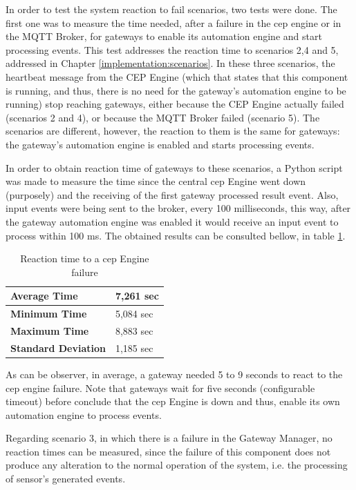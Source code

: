 In order to test the system reaction to fail scenarios, two tests were done. The first one was to measure the time needed, after a failure in the \ac{cep} engine or in the MQTT Broker, for gateways to enable its automation engine and start processing events. This test addresses the reaction time to scenarios 2,4 and 5, addressed in Chapter \ref{implementation:scenarios}. In these three scenarios, the heartbeat message from the CEP Engine (which that states that this component is running, and thus, there is no need for the gateway's automation engine to be running) stop reaching gateways, either because the CEP Engine actually failed (scenarios 2 and 4), or because the MQTT Broker failed (scenario 5). The scenarios are different, however, the reaction to them is the same for gateways: the gateway's automation engine is enabled and starts processing events. 


 In order to obtain reaction time of gateways to these scenarios, a Python script was made to measure the time since the central \ac{cep} Engine went down (purposely) and the receiving of the first gateway processed result event. Also, input events were being sent to the broker, every 100 milliseconds, this way, after the gateway automation engine was enabled it would receive an input event to process within 100 ms. The obtained results can be consulted bellow, in table \ref{cepDown}.


\begin{table}[H]
	
	\begin{tabular}{|l|l|}
		\hline
		\textbf{Average Time}       & 7,261 sec \\ \hline
		\textbf{Minimum Time}       &  5,084 sec \\ \hline
		\textbf{Maximum Time}       & 8,883 sec \\ \hline
		\textbf{Standard Deviation} & 1,185 sec \\ \hline
	\end{tabular}
	\centering
	\caption{Reaction time to a \ac{cep} Engine failure}
	\label{cepDown}
\end{table}

As can be observer, in average, a gateway needed 5 to 9 seconds to react to the \ac{cep} engine failure. Note that gateways wait for five seconds (configurable timeout) before conclude that the \ac{cep} Engine is down and thus, enable its own automation engine to process events.

Regarding scenario 3, in which there is a failure in the Gateway Manager, no reaction times can be measured, since the failure of this component does not produce any alteration to the normal operation of the system, i.e. the processing of sensor's generated events.


